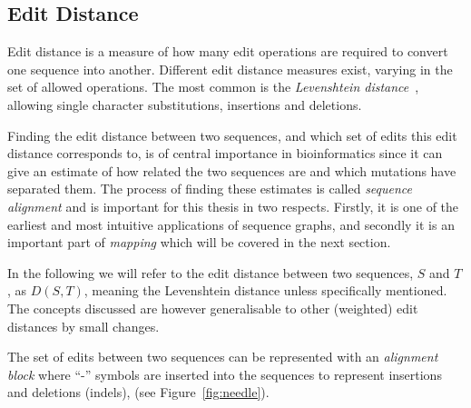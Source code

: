\subsection{Edit Distance}
Edit distance is a measure of how many edit operations are required to convert one sequence into another.
Different edit distance measures exist, varying in the set of allowed operations.
The most common is the \emph{Levenshtein distance}~\cite{levenshtein}, allowing single character substitutions, insertions and deletions. 

Finding the edit distance between two sequences, and which set of edits this edit distance corresponds to, is of central importance in bioinformatics since it can give an estimate of how related the two sequences are and which mutations have separated them.
The process of finding these estimates is called \emph{sequence alignment} and is important for this thesis in two respects.
Firstly, it is one of the earliest and most intuitive applications of sequence graphs, and secondly it is an important part of \emph{mapping} which will be covered in the next section. 

In the following we will refer to the edit distance between two sequences, $S$ and $T$, as $D(S, T)$, meaning the Levenshtein distance unless specifically mentioned.
The concepts discussed are however generalisable to other (weighted) edit distances by small changes.

The set of edits between two sequences can be represented with an \emph{alignment block} where ``-'' symbols are inserted into the sequences to represent insertions and deletions (indels), (see Figure~\ref{fig:needle}).

